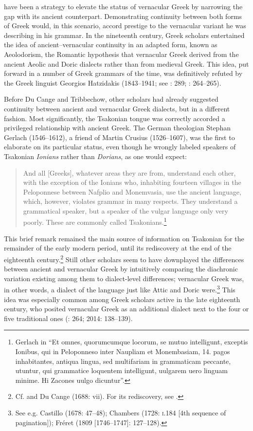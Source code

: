 \documentclass[output=paper]{langsci/langscibook}
\begin{document}
have been a strategy to elevate the status of vernacular Greek by narrowing the gap with its ancient counterpart. Demonstrating continuity between both forms of Greek would, in this scenario, accord prestige to the vernacular variant he was describing in his grammar. In the nineteenth century, Greek scholars entertained the idea of ancient–vernacular continuity in an adapted form, known as Aeolodorism, the Romantic hypothesis that vernacular Greek derived from the ancient Aeolic and Doric dialects rather than from medieval Greek. This idea, put forward in a number of Greek grammars of the time, was definitively refuted by the Greek linguist Georgios Hatzidakis (1843–1941; see \citealt{Argyropoulos2009}: 289; \citealt{Mackridge2009}: 264–265).

Before Du Cange and Tribbechow, other scholars had already suggested continuity between ancient and vernacular Greek dialects, but in a different fashion. Most significantly, the Tsakonian tongue was correctly accorded a privileged relationship with ancient Greek. The German theologian Stephan Gerlach (1546–1612), a friend of Martin Crusius (1526–1607), was the first to elaborate on its particular status, even though he wrongly labeled speakers of Tsakonian \textit{Ionians} rather than \textit{Dorians}, as one would expect:

\begin{quote}
And all [Greeks], whatever areas they are from, understand each other, with the exception of the Ionians who, inhabiting fourteen villages in the Peloponnese between Nafplio and Monemvasia, use the ancient language, which, however, violates grammar in many respects. They understand a grammatical speaker, but a speaker of the vulgar language only very poorly. These are commonly called Tsakonians.\footnote{Gerlach in \citet[489]{Crusius1584} “Et omnes, quorumcumque locorum, se mutuo intelligunt, exceptis Ionibus, qui in Peloponneso inter Naupliam et Monembasiam, 14. pagos inhabitantes, antiqua lingua, sed multifariam in grammaticam peccante, utuntur, qui grammatice loquentem intelligunt, uulgarem uero linguam minime. Hi Zacones uulgo dicuntur”.}
\end{quote}

This brief remark remained the main source of information on Tsakonian for the remainder of the early modern period, until its rediscovery at the end of the eighteenth century.\footnote{Cf. \citet[44]{Howell1650a} and Du Cange (1688: vii). For its rediscovery, see \citet{Famerie2007}.} Still other scholars seem to have downplayed the differences between ancient and vernacular Greek by intuitively comparing the diachronic variation existing among them to dialect-level differences; vernacular Greek was, in other words, a dialect of the language just like Attic and Doric were.\footnote{See e.g. Castillo (1678: 47–48); Chambers (1728: \textsc{i.}184 [4th sequence of pagination]); Fréret (1809 [1746–1747]: 127–128).} This idea was especially common among Greek scholars active in the late eighteenth century, who posited vernacular Greek as an additional dialect next to the four or five traditional ones (\citealt{Mackridge2009}: 264; 2014: 138–139).
\end{document}
